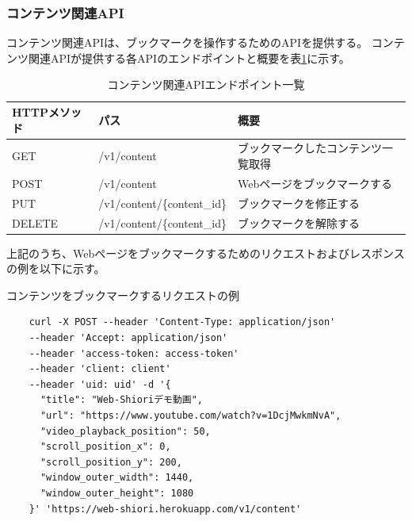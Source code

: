 \subsubsection{コンテンツ関連API}
コンテンツ関連APIは、ブックマークを操作するためのAPIを提供する。
コンテンツ関連APIが提供する各APIのエンドポイントと概要を表\ref{tb:design-content-api}に示す。

\begin{table}[htbp]
  \label{tb:design-content-api}
  \caption{コンテンツ関連APIエンドポイント一覧}
  \begin{center}
    \begin{tabular}{|l|l|l|}
      \hline
      HTTPメソッド & パス & 概要 \\\hline\hline
      GET & /v1/content & ブックマークしたコンテンツ一覧取得 \\\hline
      POST & /v1/content & Webページをブックマークする \\\hline
      PUT & /v1/content/\{content\_id\} & ブックマークを修正する \\\hline
      DELETE & /v1/content/\{content\_id\} & ブックマークを解除する \\\hline
    \end{tabular}
  \end{center}
\end{table}

上記のうち、Webページをブックマークするためのリクエストおよびレスポンスの例を以下に示す。

\begin{itembox}[l]{コンテンツをブックマークするリクエストの例}
  \label{content-request-curl}
  \begin{verbatim}
    curl -X POST --header 'Content-Type: application/json' 
    --header 'Accept: application/json' 
    --header 'access-token: access-token' 
    --header 'client: client' 
    --header 'uid: uid' -d '{
      "title": "Web-Shioriデモ動画",
      "url": "https://www.youtube.com/watch?v=1DcjMwkmNvA",
      "video_playback_position": 50,
      "scroll_position_x": 0,
      "scroll_position_y": 200,
      "window_outer_width": 1440,
      "window_outer_height": 1080
    }' 'https://web-shiori.herokuapp.com/v1/content'
  \end{verbatim}
\end{itembox}

